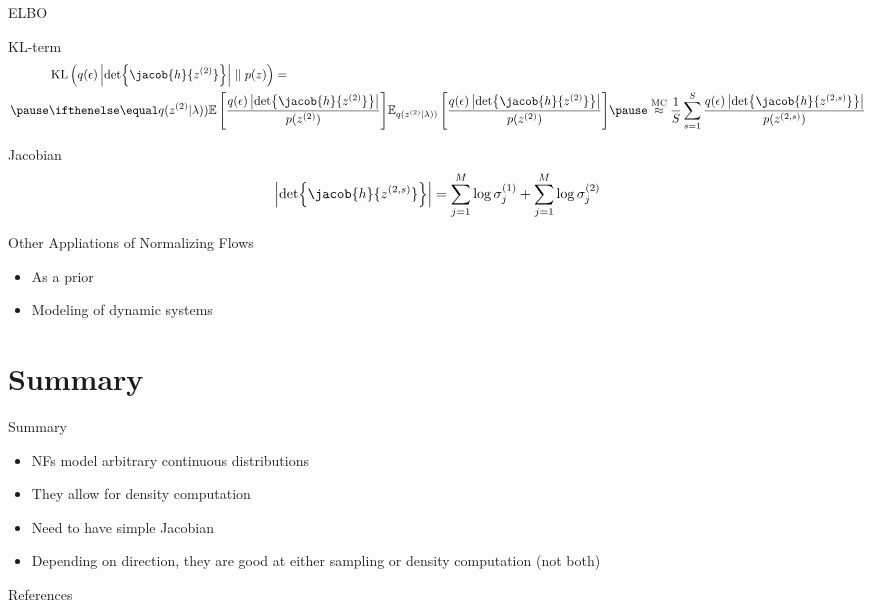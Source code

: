 \documentclass[14pt]{beamer}
\begin{document}
\begin{frame}{ELBO}
\begin{small}
\begin{block}{KL-term}
\begin{equation*}
\begin{aligned}
&\KL{q(\epsilon)\abs{\det\jacob{h}{z^{(2)}}}}{p(z)} = \\ \pause
&\E[q(z^{(2)}|\lambda))]{\frac{q(\epsilon)\abs{\det\jacob{h}{z^{(2)}}}}{p(z^{(2)})}} \pause \overset{\text{MC}}{\approx} \frac{1}{S}\sum_{s=1}^{S} \frac{q(\epsilon)\abs{\det\jacob{h}{z^{(2,s)}}}}{p(z^{(2,s)})}
\end{aligned}
\end{equation*}
\end{block}
\pause
\begin{block}{Jacobian}
\pause
\begin{equation*}
\abs{\det\jacob{h}{z^{(2,s)}}} = \sum_{j=1}^{M}\log\sigma^{(1)}_{j} + \sum_{j=1}^{M}\log\sigma^{(2)}_{j}
\end{equation*}
\end{block}
\end{small}
\end{frame}

\begin{frame}{Other Appliations of Normalizing Flows}
\begin{itemize}
\item As a prior
\item Modeling of dynamic systems
\end{itemize}
\end{frame}

\section{Summary}

\begin{frame}{Summary}
\begin{itemize}
\item NFs model arbitrary continuous distributions
\item They allow for density computation
\item Need to have simple Jacobian
\item Depending on direction, they are good at either sampling or density computation (not both)
\end{itemize}
\end{frame}

\begin{frame}[allowframebreaks]{References}


\nocite{KingmaEtAl:2016, RezendeMohamed:2015, HuangEtAl:2018}
\end{frame}
\end{document}
